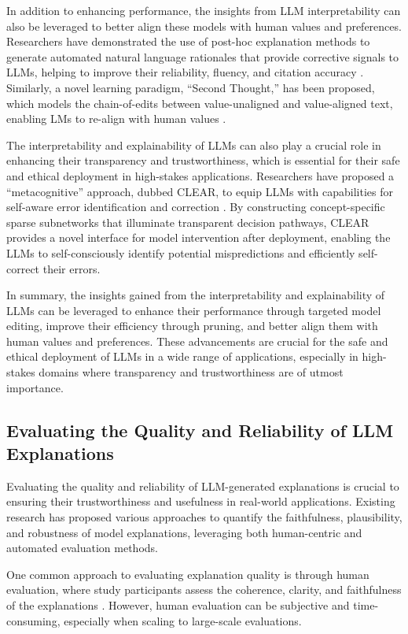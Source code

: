\documentclass[11pt]{article}
\begin{document}
In addition to enhancing performance, the insights from LLM interpretability can also be leveraged to better align these models with human values and preferences. Researchers have demonstrated the use of post-hoc explanation methods to generate automated natural language rationales that provide corrective signals to LLMs, helping to improve their reliability, fluency, and citation accuracy \cite{ref267}. Similarly, a novel learning paradigm, ``Second Thought,'' has been proposed, which models the chain-of-edits between value-unaligned and value-aligned text, enabling LMs to re-align with human values \cite{ref268}.

The interpretability and explainability of LLMs can also play a crucial role in enhancing their transparency and trustworthiness, which is essential for their safe and ethical deployment in high-stakes applications. Researchers have proposed a ``metacognitive'' approach, dubbed CLEAR, to equip LLMs with capabilities for self-aware error identification and correction \cite{ref269}. By constructing concept-specific sparse subnetworks that illuminate transparent decision pathways, CLEAR provides a novel interface for model intervention after deployment, enabling the LLMs to self-consciously identify potential mispredictions and efficiently self-correct their errors.

In summary, the insights gained from the interpretability and explainability of LLMs can be leveraged to enhance their performance through targeted model editing, improve their efficiency through pruning, and better align them with human values and preferences. These advancements are crucial for the safe and ethical deployment of LLMs in a wide range of applications, especially in high-stakes domains where transparency and trustworthiness are of utmost importance.

\subsection{Evaluating the Quality and Reliability of LLM Explanations}

Evaluating the quality and reliability of LLM-generated explanations is crucial to ensuring their trustworthiness and usefulness in real-world applications. Existing research has proposed various approaches to quantify the faithfulness, plausibility, and robustness of model explanations, leveraging both human-centric and automated evaluation methods.

One common approach to evaluating explanation quality is through human evaluation, where study participants assess the coherence, clarity, and faithfulness of the explanations \cite{ref270,ref271}. However, human evaluation can be subjective and time-consuming, especially when scaling to large-scale evaluations.
\end{document}
